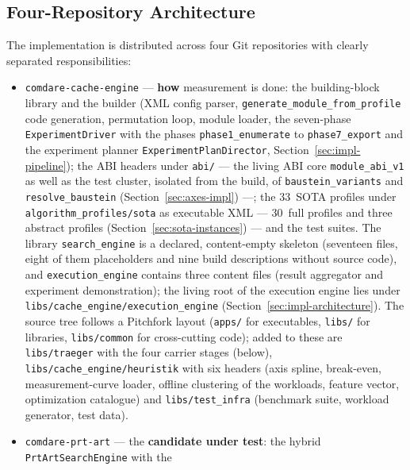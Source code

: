 \begin{nurlang}
\section{Four-Repository Architecture}\label{sec:repos}
The implementation is distributed across four Git repositories with clearly separated responsibilities:
\begin{itemize}
  \item \texttt{comdare-cache-engine} --- \textbf{how} measurement is done: the building-block library and
  the builder (XML config parser,
  \texttt{generate\_\allowbreak{}module\_\allowbreak{}from\_\allowbreak{}profile} code generation,
  permutation loop, module loader, the seven-phase \texttt{ExperimentDriver} with the phases
  \texttt{phase1\_enumerate} to \texttt{phase7\_export} and the experiment planner
  \texttt{ExperimentPlanDirector}, Section~\ref{sec:impl-pipeline}); the ABI headers under \texttt{abi/}
  --- the living ABI core \texttt{module\_\allowbreak{}abi\_\allowbreak{}v1} as well as the test cluster,
  isolated from the build, of \texttt{baustein\_\allowbreak{}variants} and
  \texttt{resolve\_\allowbreak{}baustein} (Section~\ref{sec:axes-impl}) ---; the 33~SOTA profiles under
  \texttt{algorithm\_\allowbreak{}profiles/\allowbreak{}sota} as executable XML --- 30~full profiles and
  three abstract profiles (Section~\ref{sec:sota-instances}) --- and the test suites. The library
  \texttt{search\_\allowbreak{}engine} is a declared, content-empty skeleton (seventeen files, eight of
  them placeholders and nine build descriptions without source code), and
  \texttt{execution\_\allowbreak{}engine} contains three content files (result aggregator and experiment
  demonstration); the living root of the execution engine lies under
  \texttt{libs/\allowbreak{}cache\_\allowbreak{}engine/\allowbreak{}execution\_\allowbreak{}engine}
  (Section~\ref{sec:impl-architecture}). The source tree follows a Pitchfork layout (\texttt{apps/} for
  executables, \texttt{libs/} for libraries, \texttt{libs/common} for cross-cutting code); added to these
  are \texttt{libs/traeger} with the four carrier stages (below),
  \texttt{libs/\allowbreak{}cache\_\allowbreak{}engine/\allowbreak{}heuristik} with six headers (axis
  spline, break-even, measurement-curve loader, offline clustering of the workloads, feature vector,
  optimization catalogue) and \texttt{libs/test\_infra} (benchmark suite, workload generator, test data).
  \item \texttt{comdare-prt-art} --- the \textbf{candidate under test}: the hybrid \texttt{PrtArtSearchEngine} with the

\end{itemize}
\end{nurlang}
